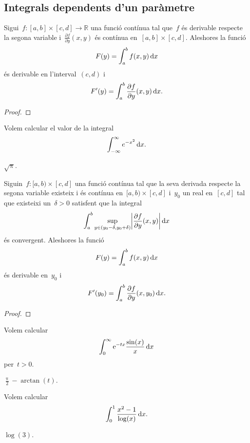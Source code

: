 \documentclass[../../Main.tex]{subfiles}
\begin{document}
	\subsection{Integrals dependents d'un paràmetre}
	\begin{theorem}
		\label{thm:criteri per la derivació sota el signe de la integral}
		Sigui~\(f\colon[a,b]\times[c,d]\longrightarrow\mathbb{R}\) una funció contínua tal que~\(f\) és derivable respecte la segona variable i~\(\frac{\partial f}{\partial y}(x,y)\) és contínua en~\([a,b]\times[c,d]\).
		Aleshores la funció
		\[
		    F(y)=\int_{a}^{b}f(x,y)\mathop{}\!\mathrm{d} x
		\]
		és derivable en l'interval~\((c,d)\) i
		\[
		    F'(y)=\int_{a}^{b}\frac{\partial f}{\partial y}(x,y)\mathop{}\!\mathrm{d} x.
		\]
		\begin{proof}
		\end{proof}
	\end{theorem}
	\begin{example}
		\label{ex:integral de Gauss}
		Volem calcular el valor de la integral
		\[
		    \int_{-\infty}^{\infty}e^{-x^{2}}\mathop{}\!\mathrm{d} x.
		\] %
		\begin{solution}
			\(\sqrt{\uppi}\).
		\end{solution}
	\end{example}
	\begin{theorem}
		\label{thm:criteri per la derivabilitat sota el signe de la integral}
		Siguin~\(f\colon[a,b)\times[c,d]\) una funció contínua tal que la seva derivada respecte la segona variable existeix i és contínua en~\([a,b)\times[c,d]\) i~\(y_{0}\) un real en~\([c,d]\) tal que existeixi un~\(\delta>0\) satisfent que la integral
		\[
		    \int_{a}^{b}\sup_{y\in(y_{0}-\delta,y_{0}+\delta)}\abs{\frac{\partial f}{\partial y}(x,y)}\diff x
		\]
		és convergent.
		Aleshores la funció
		\[
		    F(y)=\int_{a}^{b}f(x,y)\mathop{}\!\mathrm{d} x
		\]
		és derivable en~\(y_{0}\) i
		\[
		    F'(y_{0})=\int_{a}^{b}\frac{\partial f}{\partial y}(x,y_{0})\mathop{}\!\mathrm{d} x.
		\]
		\begin{proof}
		\end{proof}
	\end{theorem}
	\begin{example}
		\label{ex:trobar una funció derivant sota el signe de la integral}
		Volem calcular
		\[
		    \int_{0}^{\infty}\mathrm{e}^{-tx}\frac{\sin(x)}{x}\mathop{}\!\mathrm{d} x
		\]
		per~\(t>0\).
		\begin{solution}
			\(\frac{\uppi}{2}-\arctan(t)\).
		\end{solution}
	\end{example}
	\begin{example}
		\label{ex:trobar un valor derivant sota el signe de la integral inventant-se una funció}
		Volem calcular
		\[
		    \int_{0}^{1}\frac{x^{2}-1}{\log(x)}\mathop{}\!\mathrm{d} x.
		\]
		\begin{solution}
			\(\log(3)\).
		\end{solution}
	\end{example}
\end{document}
